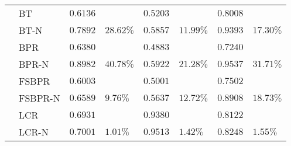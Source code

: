 \documentclass[letterpaper]{article} %
\begin{document}
\begin{table}[htp]
\begin{center}
\begin{tabular}{p{0.4cm}<{\centering}|p{1.2cm}<{\centering} |p{0.5cm} p{0.6cm} |p{0.5cm} p{0.6cm} |p{0.5cm} p{0.6cm}}
	\hline
{}	&	BT	& $0.6136$ 	& &	$0.5203$ 	&&	$0.8008$ 	&\\
	&BT-N	&$0.7892$ &	$28.62\%$	&$0.5857 $	&$11.99\%$	&$0.9393$ &	$17.30\%$	\\
	&BPR&	$0.6380$ 	&&	$0.4883$ 	&&	$0.7240$ &\\
	&BPR-N	&$0.8982$ 	&$40.78\%$	&$0.5922$ &	$21.28\%$	&$0.9537$ 	&$31.71\%$	\\
	&FSBPR		&$0.6003$&	&$0.5001$ 	&&	$0.7502$&\\	
	&FSBPR-N	&$0.6589$	&$9.76\%$	&	$0.5637$ 	&$12.72\%$	&$0.8908$ 	&$18.73\%$	\\
	&LCR		&$0.6931$&	&$0.9380$ 	&&	$0.8122$&\\	
	&LCR-N	&$0.7001$	&$1.01\%$	&	$0.9513$ 	&$1.42\%$	&$0.8248$ 	&$1.55\%$ \\
	\hline
	\end{tabular}
\end{center}
\label{tab:ratingresult}
\end{table}%
\end{document}
